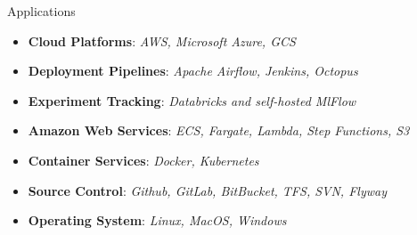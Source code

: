 \Technology
{Applications}
{\begin{itemize}
    \item \textbf{Cloud Platforms}:
      \emph{AWS, Microsoft Azure, GCS}
    \item \textbf{Deployment Pipelines}:
    \emph{Apache Airflow, Jenkins, Octopus}
    \item \textbf{Experiment Tracking}:
      \emph{Databricks and self-hosted MlFlow}
    \item \textbf{Amazon Web Services}:
      \emph{ECS, Fargate, Lambda, Step Functions, S3}
    \item \textbf{Container Services}:
      \emph{Docker, Kubernetes}
    \item \textbf{Source Control}:
      \emph{Github, GitLab, BitBucket, TFS, SVN, Flyway}
    \item \textbf{Operating System}:
      \emph{Linux, MacOS, Windows}
\end{itemize}}